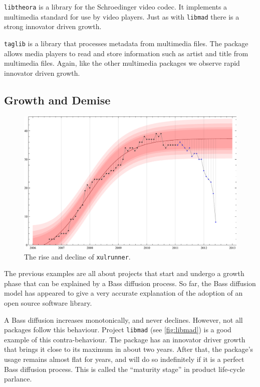 \documentclass[smallextended,final]{svjour3}
\begin{document}
\verb|libtheora| is a library for the Schroedinger video codec. It implements a multimedia standard for use by video players. Just as with \verb|libmad| there is a strong innovator driven growth.

\verb|taglib| is a library that processes metadata from multimedia files. The package allows media players to read and store information such as artist and title from multimedia files. Again, like the other multimedia packages we observe rapid innovator driven growth.

\subsection{Growth and Demise}

\begin{figure}
\small\centering
\includegraphics[width=\linewidth]{BassFit-xulrunner-22.pdf}
\vspace{-2em}
\caption{The rise and decline of \texttt{xulrunner}.}\label{fig:xulrunner}
\vspace{-1em}
\end{figure}

The previous examples are all about projects that start and undergo a growth phase that can be explained by a Bass diffusion process. So far, the Bass diffusion model has appeared to give a very accurate explanation of the adoption of an open source software library.

A Bass diffusion increases monotonically, and never declines. However, not all packages follow this behaviour. Project \verb|libmad| (see \ref{fig:libmad}) is a good example of this contra-behaviour. The package has an innovator driver growth that brings it close to its maximum in about two years. After that, the package's usage remains almost flat for years, and will do so indefinitely if it is a perfect Bass diffusion process. This is called the ``maturity stage'' in product life-cycle parlance.
\end{document}
